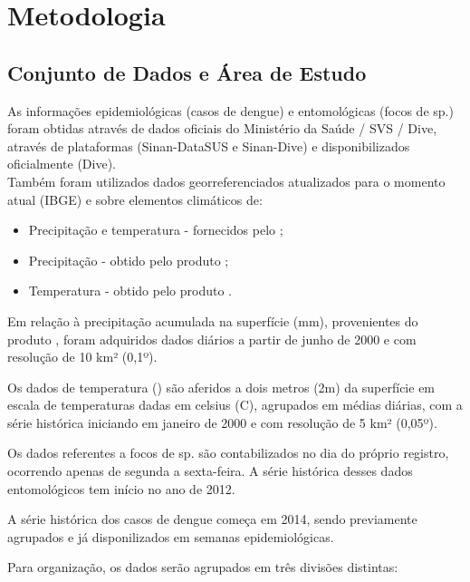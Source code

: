 \chapter{Metodologia}

\section{Conjunto de Dados e Área de Estudo}

As informações epidemiológicas (casos de dengue) e entomológicas (focos de  sp.) foram obtidas através de dados oficiais do Ministério da Saúde / \acrfull{SVS} / \acrfull{Dive}, através de plataformas  (\acrshort{Sinan}-\acrshort{DataSUS} e \acrshort{Sinan}-\acrshort{Dive}) e disponibilizados oficialmente (\acrshort{Dive}).\\
\indent Também foram utilizados dados georreferenciados atualizados para o momento atual (\acrfull{IBGE}) e sobre elementos climáticos de:
\begin{itemize}
    \item Precipitação e temperatura - fornecidos pelo ;
    \item Precipitação - obtido pelo produto ;
    \item Temperatura - obtido pelo produto .
\end{itemize}

\indent Em relação à precipitação acumulada na superfície (mm), provenientes do produto , foram adquiridos dados diários a partir de junho de 2000 e com resolução de 10 km² (0,1º).

\indent Os dados de temperatura () são aferidos a dois metros (2m) da superfície em escala de temperaturas dadas em celsius (C), agrupados em médias diárias, com a série histórica iniciando em janeiro de 2000 e com resolução de 5 km² (0,05º).

\indent Os dados referentes a focos de  sp. são contabilizados no dia do próprio registro, ocorrendo apenas de segunda a sexta-feira. A série histórica desses dados entomológicos tem início no ano de 2012.

\indent A série histórica dos casos de dengue começa em 2014, sendo previamente agrupados e já disponilizados em semanas epidemiológicas.

Para organização, os dados serão agrupados em três divisões distintas: 

